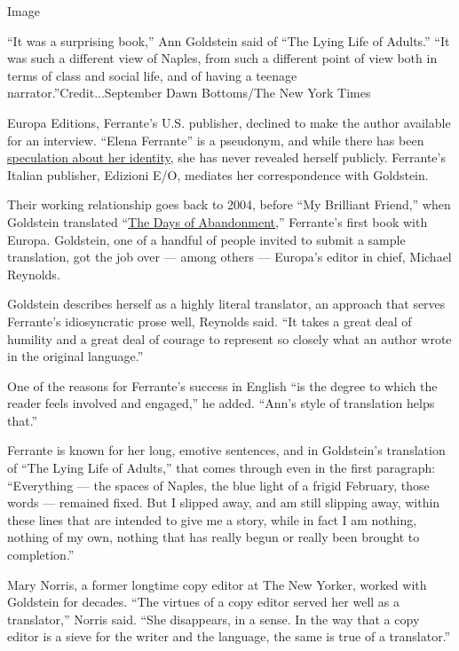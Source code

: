 Image

``It was a surprising book,'' Ann Goldstein said of ``The Lying Life of
Adults.'' ``It was such a different view of Naples, from such a
different point of view both in terms of class and social life, and of
having a teenage narrator.''Credit...September Dawn Bottoms/The New York
Times

Europa Editions, Ferrante's U.S. publisher, declined to make the author
available for an interview. ``Elena Ferrante'' is a pseudonym, and while
there has been
\href{https://www.nytimes3xbfgragh.onion/2016/10/03/books/elena-ferrante-anita-raja-domenico-starnone.html}{speculation
about her identity}, she has never revealed herself publicly. Ferrante's
Italian publisher, Edizioni E/O, mediates her correspondence with
Goldstein.

Their working relationship goes back to 2004, before ``My Brilliant
Friend,'' when Goldstein translated
``\href{https://www.nytimes3xbfgragh.onion/2005/08/25/books/a-scorned-wifes-bumpy-road-of-raging-selfawareness.html}{The
Days of Abandonment},'' Ferrante's first book with Europa. Goldstein,
one of a handful of people invited to submit a sample translation, got
the job over --- among others --- Europa's editor in chief, Michael
Reynolds.

Goldstein describes herself as a highly literal translator, an approach
that serves Ferrante's idiosyncratic prose well, Reynolds said. ``It
takes a great deal of humility and a great deal of courage to represent
so closely what an author wrote in the original language.''

One of the reasons for Ferrante's success in English ``is the degree to
which the reader feels involved and engaged,'' he added. ``Ann's style
of translation helps that.''

Ferrante is known for her long, emotive sentences, and in Goldstein's
translation of ``The Lying Life of Adults,'' that comes through even in
the first paragraph: ``Everything --- the spaces of Naples, the blue
light of a frigid February, those words --- remained fixed. But I
slipped away, and am still slipping away, within these lines that are
intended to give me a story, while in fact I am nothing, nothing of my
own, nothing that has really begun or really been brought to
completion.''

Mary Norris, a former longtime copy editor at The New Yorker, worked
with Goldstein for decades. ``The virtues of a copy editor served her
well as a translator,'' Norris said. ``She disappears, in a sense. In
the way that a copy editor is a sieve for the writer and the language,
the same is true of a translator.''

